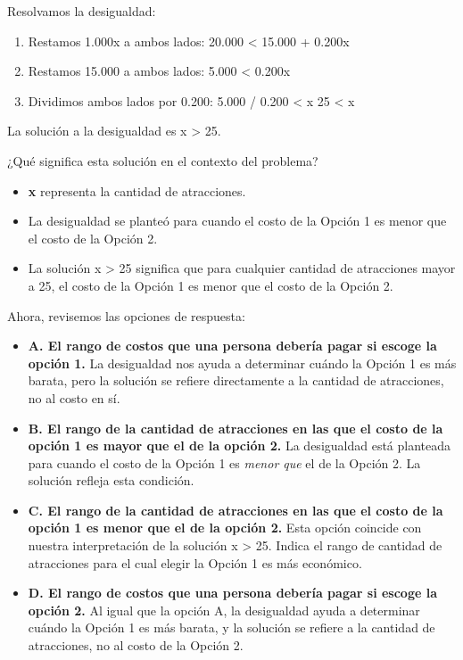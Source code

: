 \documentclass[
]{article}
\providecommand{\tightlist}{%
  \setlength{\itemsep}{0pt}\setlength{\parskip}{0pt}}
\begin{document}
Resolvamos la desigualdad:

\begin{enumerate}
\def\labelenumi{\arabic{enumi}.}
\item
  Restamos 1.000x a ambos lados: 20.000 \textless{} 15.000 + 0.200x
\item
  Restamos 15.000 a ambos lados: 5.000 \textless{} 0.200x
\item
  Dividimos ambos lados por 0.200: 5.000 / 0.200 \textless{} x 25
  \textless{} x
\end{enumerate}

La solución a la desigualdad es x \textgreater{} 25.

¿Qué significa esta solución en el contexto del problema?

\begin{itemize}
\tightlist
\item
  \textbf{x} representa la cantidad de atracciones.
\item
  La desigualdad se planteó para cuando el costo de la Opción 1 es menor
  que el costo de la Opción 2.
\item
  La solución x \textgreater{} 25 significa que para cualquier cantidad
  de atracciones mayor a 25, el costo de la Opción 1 es menor que el
  costo de la Opción 2.
\end{itemize}

Ahora, revisemos las opciones de respuesta:

\begin{itemize}
\item
  \textbf{A. El rango de costos que una persona debería pagar si escoge
  la opción 1.} La desigualdad nos ayuda a determinar cuándo la Opción 1
  es más barata, pero la solución se refiere directamente a la cantidad
  de atracciones, no al costo en sí.
\item
  \textbf{B. El rango de la cantidad de atracciones en las que el costo
  de la opción 1 es mayor que el de la opción 2.} La desigualdad está
  planteada para cuando el costo de la Opción 1 es \emph{menor que} el
  de la Opción 2. La solución refleja esta condición.
\item
  \textbf{C. El rango de la cantidad de atracciones en las que el costo
  de la opción 1 es menor que el de la opción 2.} Esta opción coincide
  con nuestra interpretación de la solución x \textgreater{} 25. Indica
  el rango de cantidad de atracciones para el cual elegir la Opción 1 es
  más económico.
\item
  \textbf{D. El rango de costos que una persona debería pagar si escoge
  la opción 2.} Al igual que la opción A, la desigualdad ayuda a
  determinar cuándo la Opción 1 es más barata, y la solución se refiere
  a la cantidad de atracciones, no al costo de la Opción 2.
\end{itemize}
\end{document}
